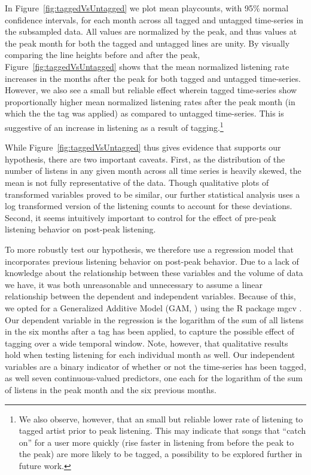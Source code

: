 In Figure~\ref{fig:taggedVsUntagged} we plot mean playcounts, with 95\% normal confidence intervals, for each month across all tagged and untagged time-series in the subsampled data. All values are normalized by the peak, and thus values at the peak month for both the tagged and untagged lines are unity. By visually comparing the line heights before and after the peak, Figure~\ref{fig:taggedVsUntagged} shows that the mean normalized listening rate increases in the months after the peak for both tagged and untagged time-series. However, we also see a small but reliable effect wherein tagged time-series show proportionally higher mean normalized listening rates after the peak month (in which the the tag was applied) as compared to untagged time-series. This is suggestive of an increase in listening as a result of tagging.\footnote{We also observe, however, that an small but reliable lower rate of listening to tagged artist prior to peak listening. This may indicate that songs that ``catch on'' for a user more quickly (rise faster in listening from before the peak to the peak) are more likely to be tagged, a possibility to be explored further in future work.}

While Figure~\ref{fig:taggedVsUntagged} thus gives evidence that supports our hypothesis, there are two important caveats. First, as the distribution of the number of listens in any given month across all time series is heavily skewed, the mean is not fully representative of the data. Though qualitative plots of transformed variables proved to be similar, our further statistical analysis uses a log transformed version of the listening counts to account for these deviations. Second, it seems intuitively important to control for the effect of pre-peak listening behavior on post-peak listening.

 To more robustly test our hypothesis, we therefore use a regression model that incorporates previous listening behavior on post-peak behavior. Due to a lack of knowledge about the relationship between these variables and the volume of data we have, it was both unreasonable and unnecessary to assume a linear relationship between the dependent and independent variables. Because of this, we opted for a Generalized Additive Model (GAM, \cite{hastie1990generalized}) using the R package mgcv \cite{wood2001mgcv}. Our dependent variable in the regression is the logarithm of the sum of all listens in the six months after a tag has been applied, to capture the possible effect of tagging over a wide temporal window. Note, however, that qualitative results hold when testing listening for each individual month as well.
Our independent variables are a binary indicator of whether or not the time-series has been tagged, as well seven continuous-valued predictors, one each for the logarithm of the sum of listens in the peak month and the six previous months.   

